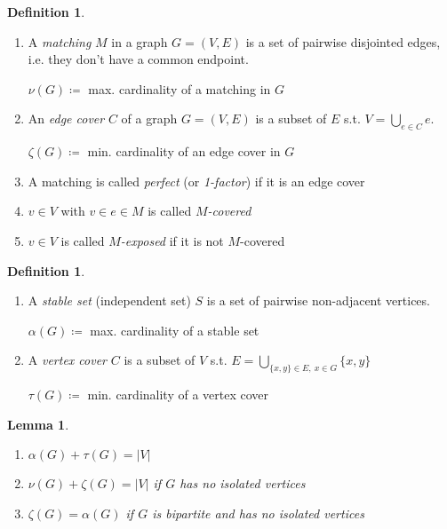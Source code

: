 \documentclass[11pt, a4paper]{article}
\newcommand{\abs}[1]{\left\lvert#1\right\rvert}
\newtheorem{lemma}[theorem]{Lemma}
\theoremstyle{remark}
\theoremstyle{definition}
\newtheorem{definition}[theorem]{Definition}
\begin{document}
\begin{definition}\ 
\begin{enumerate}
	\item A \emph{matching} $M$ in a graph $G=(V,E)$ is a set of
	pairwise disjointed edges, i.e. they don't have a common endpoint.

	$\nu(G)\coloneqq$ max. cardinality of a matching in $G$

	\item An \emph{edge cover} $C$ of a graph $G=(V,E)$ is a subset
	of $E$ s.t.  $V=\bigcup_{e\in C}e$.

	$\zeta(G) \coloneqq$ min. cardinality of an edge cover in $G$
	
	\item A matching is called \emph{perfect} (or \emph{1-factor})
	if it is an edge cover
	
	\item $v\in V$ with $v\in e\in M$ is called \emph{$M$-covered}
	
	\item $v\in V$ is called \emph{$M$-exposed} if it is not
	$M$-covered
\end{enumerate}
\end{definition}

\begin{definition}\ 
\begin{enumerate}
	\item A \emph{stable set} (independent set) $S$ is a set of
	pairwise non-adjacent vertices.
	
	$\alpha(G)\coloneqq$ max. cardinality of a stable set
	
	\item A \emph{vertex cover} $C$ is a subset of $V$ s.t.
	$E=\bigcup_{\{x,y\}\in E,\ x\in G}\{x,y\}$
	
	$\tau(G)\coloneqq$ min. cardinality of a vertex cover
\end{enumerate}
\end{definition}

\begin{lemma}\ 
\begin{enumerate}
	\item $\alpha(G)+\tau(G) = \abs{V}$
	\item $\nu(G) + \zeta(G) = \abs{V}$ if $G$ has no isolated vertices
	\item $\zeta(G)=\alpha(G)$ if $G$ is bipartite and has no isolated
	vertices
\end{enumerate}
\end{lemma}
\end{document}
